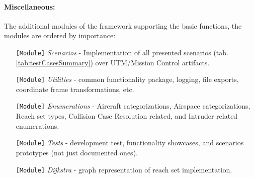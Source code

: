 \paragraph{Miscellaneous:} The additional modules of the framework supporting the basic functions, the modules are ordered by importance:
\begin{itemize}
    \item[\texttt{[Module]}] \emph{Scenarios} - Implementation of all presented scenarios (tab. \ref{tab:testCasesSummary}) over UTM/Mission Control artifacts.
    
    \item[\texttt{[Module]}] \emph{Utilities} - common functionality package, logging, file exports, coordinate frame transformations, etc. 
    
    \item[\texttt{[Module]}] \emph{Enumerations} - Aircraft categorizations, Airspace categorizations, Reach set types, Collision Case Resolution related, and Intruder related enumerations.
    
    \item[\texttt{[Module]}] \emph{Tests} - development test, functionality showcases, and scenarios prototypes (not just documented ones).
    
    \item[\texttt{[Module]}] \emph{Dijkstra} - graph representation of reach set implementation.    
\end{itemize}